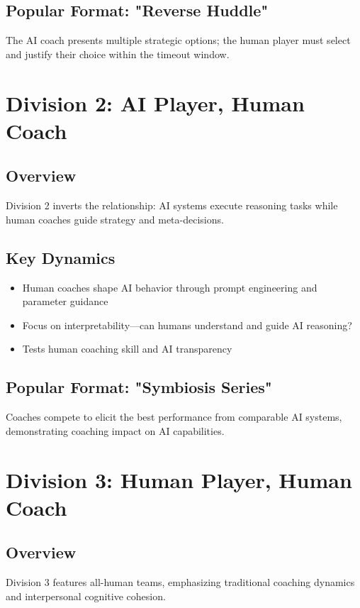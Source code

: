 \subsection{Popular Format: "Reverse Huddle"}
The AI coach presents multiple strategic options; the human player must select and justify their choice within the timeout window.

\section{Division 2: AI Player, Human Coach}

\subsection{Overview}
Division 2 inverts the relationship: AI systems execute reasoning tasks while human coaches guide strategy and meta-decisions.

\subsection{Key Dynamics}
\begin{itemize}[leftmargin=*]
  \item Human coaches shape AI behavior through prompt engineering and parameter guidance
  \item Focus on interpretability—can humans understand and guide AI reasoning?
  \item Tests human coaching skill and AI transparency
\end{itemize}

\subsection{Popular Format: "Symbiosis Series"}
Coaches compete to elicit the best performance from comparable AI systems, demonstrating coaching impact on AI capabilities.

\section{Division 3: Human Player, Human Coach}

\subsection{Overview}
Division 3 features all-human teams, emphasizing traditional coaching dynamics and interpersonal cognitive cohesion.

